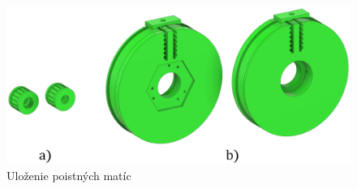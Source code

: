  \begin{figure}[]
 	\centering
 	\includegraphics[width=150mm]{obr/3Dkolieska.eps}
 	\caption{Uloženie poistných matíc}\label{OBRAZOK 2.5.5} 
 \end{figure} 